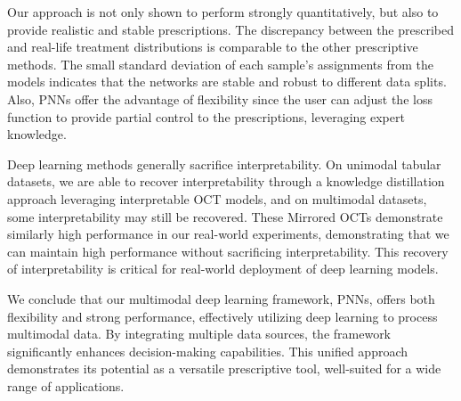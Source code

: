 \documentclass[10pt]{article} %
\begin{document}
Our approach is not only shown to perform strongly quantitatively, but also to provide realistic and stable prescriptions. The discrepancy between the prescribed and real-life treatment distributions is comparable to the other prescriptive methods. The small standard deviation of each sample's assignments from the models indicates that the networks are stable and robust to different data splits. Also, PNNs offer the advantage of flexibility since the user can adjust the loss function to provide partial control to the prescriptions, leveraging expert knowledge. 

Deep learning methods generally sacrifice interpretability. On unimodal tabular datasets, we are able to recover interpretability through a knowledge distillation approach leveraging interpretable OCT models, and on multimodal datasets, some interpretability may still be recovered. These Mirrored OCTs demonstrate similarly high performance in our real-world experiments, demonstrating that we can maintain high performance without sacrificing interpretability. This recovery of interpretability is critical for real-world deployment of deep learning models.

We conclude that our multimodal deep learning framework, PNNs, offers both flexibility and strong performance, effectively utilizing deep learning to process multimodal data. By integrating multiple data sources, the framework significantly enhances decision-making capabilities. This unified approach demonstrates its potential as a versatile prescriptive tool, well-suited for a wide range of applications.

\end{document}
